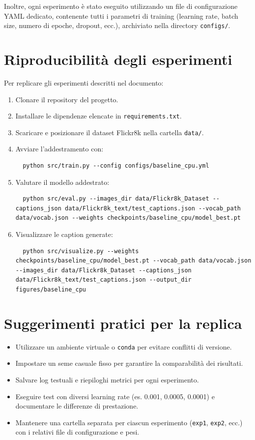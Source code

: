 \documentclass[11pt,a4paper]{report}
\begin{document}
Inoltre, ogni esperimento è stato eseguito utilizzando un file di configurazione YAML dedicato, contenente tutti i parametri di training (learning rate, batch size, numero di epoche, dropout, ecc.), archiviato nella directory \texttt{configs/}.

\section{Riproducibilità degli esperimenti}

Per replicare gli esperimenti descritti nel documento:

\begin{enumerate}
  \item Clonare il repository del progetto.
  \item Installare le dipendenze elencate in \texttt{requirements.txt}.
  \item Scaricare e posizionare il dataset Flickr8k nella cartella \texttt{data/}.
  \item Avviare l’addestramento con:
  \begin{verbatim}
  python src/train.py --config configs/baseline_cpu.yml
  \end{verbatim}
  \item Valutare il modello addestrato:
  \begin{verbatim}
  python src/eval.py --images_dir data/Flickr8k_Dataset --captions_json data/Flickr8k_text/test_captions.json --vocab_path data/vocab.json --weights checkpoints/baseline_cpu/model_best.pt
  \end{verbatim}
  \item Visualizzare le caption generate:
  \begin{verbatim}
  python src/visualize.py --weights checkpoints/baseline_cpu/model_best.pt --vocab_path data/vocab.json --images_dir data/Flickr8k_Dataset --captions_json data/Flickr8k_text/test_captions.json --output_dir figures/baseline_cpu
  \end{verbatim}
\end{enumerate}

\section{Suggerimenti pratici per la replica}

\begin{itemize}
  \item Utilizzare un ambiente virtuale o \texttt{conda} per evitare conflitti di versione.
  \item Impostare un seme casuale fisso per garantire la comparabilità dei risultati.
  \item Salvare log testuali e riepiloghi metrici per ogni esperimento.
  \item Eseguire test con diversi learning rate (es. 0.001, 0.0005, 0.0001) e documentare le differenze di prestazione.
  \item Mantenere una cartella separata per ciascun esperimento (\texttt{exp1}, \texttt{exp2}, ecc.) con i relativi file di configurazione e pesi.
\end{itemize}
\end{document}
